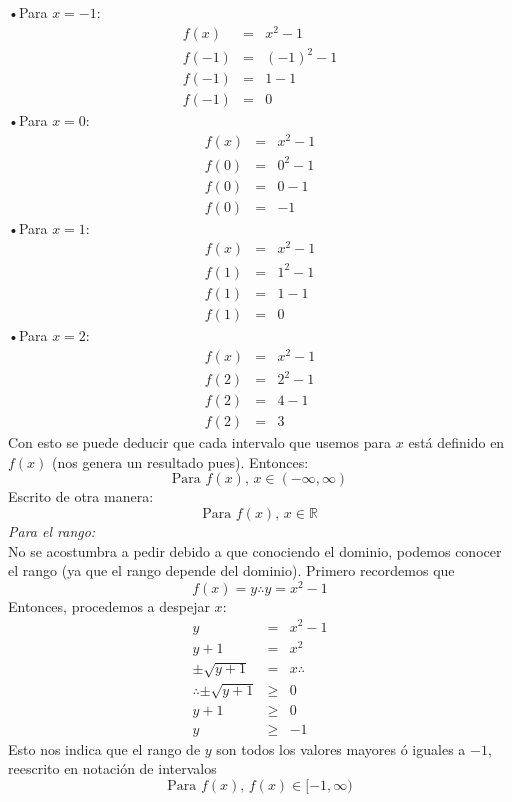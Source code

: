 \documentclass[letterpaper, 12pt]{article}
\begin{document}
            •Para \(x=-1\):
            \[\begin{matrix}
                f(x)&=&x^2-1\\
                f(-1)&=&(-1)^2-1\\
                f(-1)&=&1-1\\
                f(-1)&=&0
            \end{matrix}\]
            •Para \(x=0\):            
            \[\begin{matrix}
                f(x)&=&x^2-1\\
                f(0)&=&0^2-1\\
                f(0)&=&0-1\\
                f(0)&=&-1
            \end{matrix}\]
            •Para \(x=1\):
            \[\begin{matrix}
                f(x)&=&x^2-1\\
                f(1)&=&1^2-1\\
                f(1)&=&1-1\\
                f(1)&=&0
            \end{matrix}\]
            •Para \(x=2\):
            \[\begin{matrix}
                f(x)&=&x^2-1\\
                f(2)&=&2^2-1\\
                f(2)&=&4-1\\
                f(2)&=&3
            \end{matrix}\]
        Con esto se puede deducir que cada intervalo que usemos para \(x\) está definido en \(f(x)\) (nos genera un resultado pues). Entonces:
        \[\text{Para }f(x),\, x\in(-\infty,\infty)\]
        Escrito de otra manera:
        \[\text{Para }f(x),\, x\in \mathbb{R}\]
        \emph{Para el rango:}        \\
        No se acostumbra a pedir debido a que conociendo el dominio, podemos conocer el rango (ya que el rango depende del dominio). Primero recordemos que
        \[f(x)=y\therefore y=x^2-1\]
        Entonces, procedemos a despejar \(x\):
        \[\begin{matrix}
            y&=&x^2-1\\
            y+1&=&x^2\\
            \pm\sqrt{y+1}&=&x\therefore\\
            \therefore\pm\sqrt{y+1}&\geq&0\\
            y+1&\geq&0\\
            y&\geq&-1
        \end{matrix}\]
        Esto nos indica que el rango de \(y\) son todos los valores mayores ó iguales a \(-1\), reescrito en notación de intervalos
        \[\text{Para }f(x),\, f(x)\in[-1,\infty)\]
\end{document}
